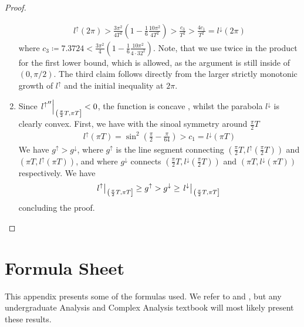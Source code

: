 \begin{proof}
\begin{enumerate}[label=(\roman*)]
        \begin{align}
            l^\uparrow(2\pi) > \frac{3\pi^2}{4T^2}\left(1-\frac{1}{6}\frac{10\pi^2}{4T^2}\right) > \frac{c_3}{T^2} > \frac{4c_1}{T^2} = l^\downarrow(2\pi)
        \end{align}
        where \(c_3 \coloneqq 7.3724 < \frac{3\pi^2}{4}\left(1-\frac{1}{6}\frac{10\pi^2}{4 \cdot 32^2}\right)\). Note, that we use  twice in the product for the first lower bound, which is allowed, as the argument is still inside of \((0, \pi/2)\). The third claim follows directly from the larger strictly monotonic growth of \(l^\uparrow\) and the initial inequality at \(2 \pi\).
        \item \label{sine_comp_lemma_3} Since \(\left.{{l^\uparrow}''}\middle|\right._{\left(\frac{\pi}{2}T, \pi T\right]} < 0\), the function is concave \cite[pp. 185-187]{Forster2016}, whilst the parabola \(l^\downarrow\) is clearly convex. First, we have with the sinoal symmetry around \(\frac{\pi}{2} T\)
        \begin{align}
            l^\uparrow(\pi T) = \sin^2\left(\frac{\pi}{2} - \frac{\pi}{64}\right) > c_1 = l^\downarrow(\pi T) \label{helper_qubits_needed}
        \end{align}
        We have \(g^\uparrow > g^\downarrow\), where \(g^\uparrow\) is the line segment connecting \(\left(\frac{\pi}{2}T, l^\uparrow\left(\frac{\pi}{2}T\right)\right)\) and \((\pi T, l^\uparrow(\pi T))\), and where \(g^\downarrow\) connects \(\left(\frac{\pi}{2}T, l^\downarrow\left(\frac{\pi}{2}T\right)\right)\) and \((\pi T, l^\downarrow(\pi T))\) respectively. We have
        \begin{align}
            \left.{l^\uparrow}\middle|\right._{\left(\frac{\pi}{2}T, \pi T\right]} \geq g^\uparrow > g^\downarrow \geq \left.{l^\downarrow}\middle|\right._{\left(\frac{\pi}{2}T, \pi T\right]}\
        \end{align}
        concluding the proof.
    \end{enumerate}
\end{proof}

\newpage

\section{Formula Sheet}

This appendix presents some of the formulas used. We refer to \cite{Forster2016} and \cite{Jaenich2004}, but any undergraduate Analysis and Complex Analysis textbook will most likely present these results.

